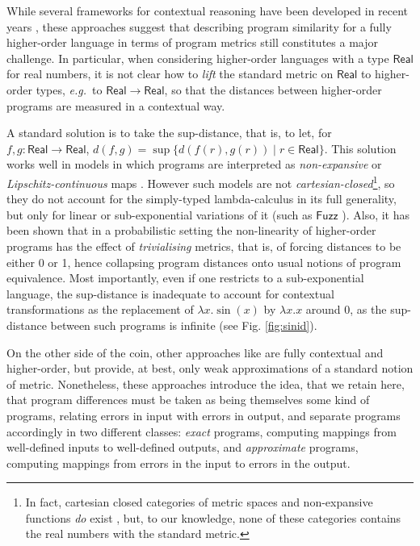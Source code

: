 While several frameworks  for contextual reasoning have been developed in recent years \cite{10.1145/1932681.1863568,Gaboardi_2013,Azevedo_de_Amorim_2017,chaudhuri, dallago:differential-stlc}, these approaches suggest that describing program similarity for a fully higher-order language in terms of program metrics still constitutes a major challenge. 
%
In particular, when considering higher-order languages with a type $\mathsf{Real}$ for real numbers, it is not clear how to \emph{lift} the standard metric on $\mathsf{Real}$  
 to higher-order types, \emph{e.g.}~to $\mathsf{Real}\to \mathsf{Real}$, so that the distances between higher-order programs are measured in a contextual way.



A standard solution is to take the sup-distance, that is, to let, for $f,g:\mathsf{Real}\to \mathsf{Real}$, $d(f,g)=\sup\{d(f(r),g(r))\mid r\in \mathsf{Real}\}$. This solution works well in models in which programs are interpreted as \emph{non-expansive} or \emph{Lipschitz-continuous} maps \cite{Hofmann2014, Azevedo_de_Amorim_2017}. However such models are not \emph{cartesian-closed}\footnote{In fact, cartesian closed categories of metric spaces and non-expansive functions \emph{do} exist \cite{Escardo1999, Stubbe2009}, but, to our knowledge, none of these categories contains the real numbers with the standard metric.}, so they do not account for 
 the simply-typed lambda-calculus in its full generality, but only for linear or sub-exponential variations of it (such as $\mathsf{Fuzz}$ \cite{10.1145/1932681.1863568,Gaboardi_2013,Azevedo_de_Amorim_2017}).
 Also, it has been shown \cite{10.1109/LICS.2015.64} that in a probabilistic setting the non-linearity of higher-order programs has the effect of \emph{trivialising} metrics, that is, of forcing distances to be either 0 or 1, hence collapsing program distances onto usual notions of program equivalence.
Most importantly, even if one restricts to a sub-exponential language, the sup-distance is inadequate to account for contextual transformations as the replacement of $\lambda x.\sin(x)$ by $\lambda x.x$ around 0,  as the sup-distance between such programs is infinite (see Fig. \ref{fig:sinid}). 
 
 
On the other side of the coin, other approaches like \cite{chaudhuri, dallago:differential-stlc} are fully contextual and higher-order, but provide, at best, only weak approximations of a standard notion of metric.  
 Nonetheless, these approaches introduce the idea, that we retain here, that program differences must be taken as being themselves some kind of programs, relating errors in input with errors in  output,  and separate programs accordingly in two different classes: \emph{exact} programs, computing mappings from well-defined inputs to well-defined outputs, and \emph{approximate} programs, computing mappings from errors in the input to errors in the output.
%

